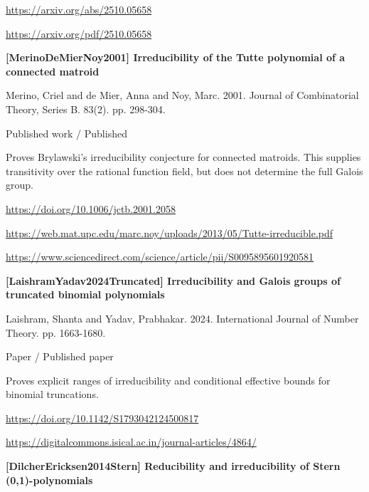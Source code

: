 \documentclass[11pt,a4paper,oneside,openany]{book}
\begin{document}
{\footnotesize\url{https://arxiv.org/abs/2510.05658}}\par
{\footnotesize\url{https://arxiv.org/pdf/2510.05658}}\par
\vspace{9pt}
\hypertarget{ref:MerinoDeMierNoy2001}{}
{\sffamily\bfseries\color{atlasgreen}[MerinoDeMierNoy2001] Irreducibility of the Tutte polynomial of a connected matroid}\par
\color{black} Merino, Criel and de Mier, Anna and Noy, Marc. 2001. Journal of Combinatorial Theory, Series B. 83(2). pp. 298-304.\par
{\small\sffamily\color{atlasgold}Published work / Published}\par
\color{black} Proves Brylawski's irreducibility conjecture for connected matroids. This supplies transitivity over the rational function field, but does not determine the full Galois group.\par
{\footnotesize\url{https://doi.org/10.1006/jctb.2001.2058}}\par
{\footnotesize\url{https://web.mat.upc.edu/marc.noy/uploads/2013/05/Tutte-irreducible.pdf}}\par
{\footnotesize\url{https://www.sciencedirect.com/science/article/pii/S0095895601920581}}\par
\vspace{9pt}
\hypertarget{ref:LaishramYadav2024Truncated}{}
{\sffamily\bfseries\color{atlasgreen}[LaishramYadav2024Truncated] Irreducibility and Galois groups of truncated binomial polynomials}\par
\color{black} Laishram, Shanta and Yadav, Prabhakar. 2024. International Journal of Number Theory. pp. 1663-1680.\par
{\small\sffamily\color{atlasgold}Paper / Published paper}\par
\color{black} Proves explicit ranges of irreducibility and conditional effective bounds for binomial truncations.\par
{\footnotesize\url{https://doi.org/10.1142/S1793042124500817}}\par
{\footnotesize\url{https://digitalcommons.isical.ac.in/journal-articles/4864/}}\par
\vspace{9pt}
\hypertarget{ref:DilcherEricksen2014Stern}{}
{\sffamily\bfseries\color{atlasgreen}[DilcherEricksen2014Stern] Reducibility and irreducibility of Stern (0,1)-polynomials}\par
\end{document}
